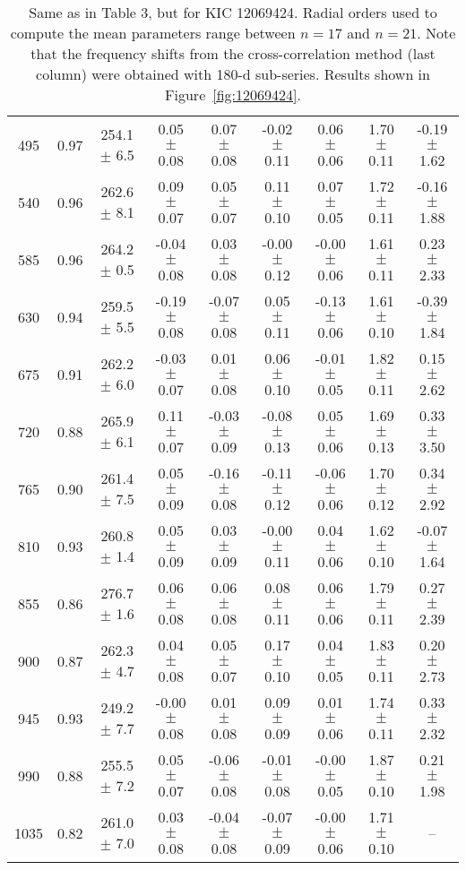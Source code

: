 \documentclass[twocolumn]{aastex61}%
\begin{document}
\begin{table*}[ht]
\begin{tabular}{ccc|ccccc|c}
495 & 0.97 & 254.1 $\pm$ 6.5 & 0.05 $\pm$ 0.08 & 0.07 $\pm$ 0.08 & -0.02 $\pm$ 0.11 & 0.06 $\pm$ 0.06 & 1.70 $\pm$ 0.11 & -0.19 $\pm$ 1.62\\
540 & 0.96 & 262.6 $\pm$ 8.1 & 0.09 $\pm$ 0.07 & 0.05 $\pm$ 0.07 & 0.11 $\pm$ 0.10 & 0.07 $\pm$ 0.05 & 1.72 $\pm$ 0.11 & -0.16 $\pm$ 1.88\\
585 & 0.96 & 264.2 $\pm$ 0.5 & -0.04 $\pm$ 0.08 & 0.03 $\pm$ 0.08 & -0.00 $\pm$ 0.12 & -0.00 $\pm$ 0.06 & 1.61 $\pm$ 0.11 & 0.23 $\pm$ 2.33\\
630 & 0.94 & 259.5 $\pm$ 5.5 & -0.19 $\pm$ 0.08 & -0.07 $\pm$ 0.08 & 0.05 $\pm$ 0.11 & -0.13 $\pm$ 0.06 & 1.61 $\pm$ 0.10 & -0.39 $\pm$ 1.84\\
675 & 0.91 & 262.2 $\pm$ 6.0 & -0.03 $\pm$ 0.07 & 0.01 $\pm$ 0.08 & 0.06 $\pm$ 0.10 & -0.01 $\pm$ 0.05 & 1.82 $\pm$ 0.11 & 0.15 $\pm$ 2.62\\
720 & 0.88 & 265.9 $\pm$ 6.1 & 0.11 $\pm$ 0.07 & -0.03 $\pm$ 0.09 & -0.08 $\pm$ 0.13 & 0.05 $\pm$ 0.06 & 1.69 $\pm$ 0.13 & 0.33 $\pm$ 3.50\\
765 & 0.90 & 261.4 $\pm$ 7.5 & 0.05 $\pm$ 0.09 & -0.16 $\pm$ 0.08 & -0.11 $\pm$ 0.12 & -0.06 $\pm$ 0.06 & 1.70 $\pm$ 0.12 & 0.34 $\pm$ 2.92\\
810 & 0.93 & 260.8 $\pm$ 1.4 & 0.05 $\pm$ 0.09 & 0.03 $\pm$ 0.09 & -0.00 $\pm$ 0.11 & 0.04 $\pm$ 0.06 & 1.62 $\pm$ 0.10 & -0.07 $\pm$ 1.64\\
855 & 0.86 & 276.7 $\pm$ 1.6 & 0.06 $\pm$ 0.08 & 0.06 $\pm$ 0.08 & 0.08 $\pm$ 0.11 & 0.06 $\pm$ 0.06 & 1.79 $\pm$ 0.11 & 0.27 $\pm$ 2.39\\
900 & 0.87 & 262.3 $\pm$ 4.7 & 0.04 $\pm$ 0.08 & 0.05 $\pm$ 0.07 & 0.17 $\pm$ 0.10 & 0.04 $\pm$ 0.05 & 1.83 $\pm$ 0.11 & 0.20 $\pm$ 2.73\\
945 & 0.93 & 249.2 $\pm$ 7.7 & -0.00 $\pm$ 0.08 & 0.01 $\pm$ 0.08 & 0.09 $\pm$ 0.09 & 0.01 $\pm$ 0.06 & 1.74 $\pm$ 0.11 & 0.33 $\pm$ 2.32\\
990 & 0.88 & 255.5 $\pm$ 7.2 & 0.05 $\pm$ 0.07 & -0.06 $\pm$ 0.08 & -0.01 $\pm$ 0.08 & -0.00 $\pm$ 0.05 & 1.87 $\pm$ 0.10 & 0.21 $\pm$ 1.98\\
1035 & 0.82 & 261.0 $\pm$ 7.0 & 0.03 $\pm$ 0.08 & -0.04 $\pm$ 0.08 & -0.07 $\pm$ 0.09 & -0.00 $\pm$ 0.06 & 1.71 $\pm$ 0.10 & --\\
\end{tabular}
\caption{Same as in Table 3, but for KIC 12069424. {Radial orders used to compute the mean parameters range between $n=17$ and $n=21$.} Note that the frequency shifts from the cross-correlation method (last column) were obtained with 180-d sub-series. Results shown in Figure~\ref{fig:12069424}.}\label{tab:12069424}
\end{table*}
\end{document}
